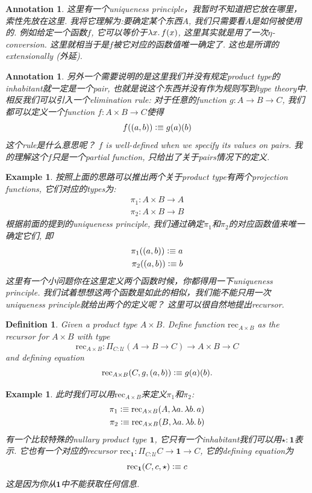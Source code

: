 \documentclass{article}
\newtheorem{example}[theorem]{Example}
\newtheorem{definition}[theorem]{Definition}
\newtheorem{annotation}[theorem]{Annotation}
\newcommand{\lam}[2]{\ensuremath{\lambda #1\ldotp #2}} %
\newcommand{\defeqv}{\vcentcolon\equiv}
\begin{document}
\begin{annotation}
\rm 这里有一个uniqueness principle，我暂时不知道把它放在哪里，索性先放在这里. 我将它理解为:要确定某个东西$A$, 我们只需要看$A$是如何被使用的. 例如给定一个函数$f$, 它可以等价于$\lam{x}{f(x)}$, 这里其实就是用了一次$\eta$-conversion. 这里就相当于是$f$被它对应的函数值唯一确定了. 这也是所谓的extensionally (外延). %
\end{annotation}

\begin{annotation}
\rm 另外一个需要说明的是这里我们并没有规定product type的inhabitant就一定是一个pair, 也就是说这个东西并没有作为规则写到type theory中. 相反我们可以引入一个elimination rule: 对于任意的function $g: A \to B \to C$, 我们都可以定义一个function $f: A \times B \to C$使得
\[
	f((a,b)) \defeqv g(a)(b)
\]
这个rule是什么意思呢？ $f$ is well-defined when we specify its values on pairs. 我的理解这个$f$只是一个partial function, 只给出了关于pairs情况下的定义. %
\end{annotation}

\begin{example}
\rm 按照上面的思路可以推出两个关于product type有两个projection functions, 它们对应的types为:
\[
	\begin{aligned}
	\pi_1: A \times B \to A \\
	\pi_2: A \times B \to B
	\end{aligned}
\]
根据前面的提到的uniqueness principle, 我们通过确定$\pi_1$和$\pi_2$的对应函数值来唯一确定它们, 即
\[
	\begin{aligned}
	\pi_1((a,b)) \defeqv a \\
	\pi_2((a,b)) \defeqv b 
	\end{aligned}
\]
这里有一个小问题你在这里定义两个函数时候，你都得用一下uniqueness principle. 我们试着想想这两个函数是如此的相似，我们能不能只用一次uniqueness principle就给出两个的定义呢？ 这里可以很自然地提出recursor.
\end{example}

\begin{definition}
\rm Given a product type $A \times B$. Define function $\text{rec}_{A \times B}$ as the recursor for $A \times B$ with type
\[
	\text{rec}_{A \times B}:\Pi_{C:\mathcal{U}}(A \to B \to C) \to A \times B \to C
\]
and defining equation
\[
	\text{rec}_{A \times B}(C, g, (a,b)) \defeqv g(a)(b).
\]
\end{definition}

\begin{example}
\rm 此时我们可以用$\text{rec}_{A \times B}$来定义$\pi_1$和$\pi_2$:
\[
	\begin{aligned}
	\pi_1 \defeqv \text{rec}_{A \times B}(A, \lam{a}{\lam{b}{a}}) \\
	\pi_2 \defeqv \text{rec}_{A \times B}(B, \lam{a}{\lam{b}{b}})
	\end{aligned}
\]
有一个比较特殊的nullary product type $\mathbf{1}$, 它只有一个inhabitant我们可以用$\star:\mathbf{1}$表示. 它也有一个对应的recursor $\text{rec}_\mathbf{1}: \Pi_{C:\mathcal{U}} C \to \mathbf{1} \to C$, 它的defining equation为
\[
	\text{rec}_\mathbf{1}(C, c, \star) \defeqv c 
\]
这是因为你从$\mathbf{1}$中不能获取任何信息.
\end{example}
\end{document}
